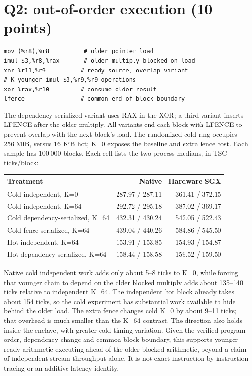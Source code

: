 \documentclass[11pt]{article}
\begin{document}
\section{Q2: out-of-order execution (10 points)}
\begin{verbatim}
mov (%r8),%r8          # older pointer load
imul $3,%r8,%rax       # older multiply blocked on load
xor %r11,%r9          # ready source, overlap variant
# K younger imul $3,%r9,%r9 operations
xor %rax,%r10         # consume older result
lfence                # common end-of-block boundary
\end{verbatim}
The dependency-serialized variant uses RAX in the XOR; a third variant inserts LFENCE after the older multiply. All variants end each block with LFENCE to prevent overlap with the next block's load. The randomized cold ring occupies 256 MiB, versus 16 KiB hot; K=0 exposes the baseline and extra fence cost. Each sample has 100,000 blocks. Each cell lists the two process medians, in TSC ticks/block:
\begin{center}\begin{tabular}{lrr}
Treatment & Native & Hardware SGX\\\hline
Cold independent, K=0 & 287.97 / 287.11 & 361.41 / 372.15\\
Cold independent, K=64 & 292.72 / 295.18 & 387.02 / 369.17\\
Cold dependency-serialized, K=64 & 432.31 / 430.24 & 542.05 / 522.43\\
Cold fence-serialized, K=64 & 439.04 / 440.26 & 584.86 / 545.50\\
Hot independent, K=64 & 153.91 / 153.85 & 154.93 / 154.87\\
Hot dependency-serialized, K=64 & 158.44 / 158.58 & 159.52 / 159.50
\end{tabular}\end{center}
Native cold independent work adds only about 5--8 ticks to K=0, while forcing that younger chain to depend on the older blocked multiply adds about 135--140 ticks relative to independent K=64. The independent hot block already takes about 154 ticks, so the cold experiment has substantial work available to hide behind the older load. The extra fence changes cold K=0 by about 9--11 ticks; that overhead is much smaller than the K=64 contrast. The direction also holds inside the enclave, with greater cold timing variation. Given the verified program order, dependency change and common block boundary, this supports younger ready arithmetic executing ahead of the older blocked arithmetic, beyond a claim of independent-stream throughput alone. It is not exact instruction-by-instruction tracing or an additive latency identity.
\end{document}
